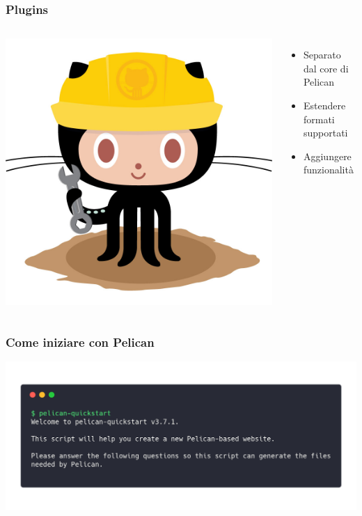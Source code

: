 \begin{frame}
	\frametitle{Plugins}
	\begin{columns}
		\begin{center}
			\includegraphics[scale=0.15]{img/octocats/constructocat2.jpg}
		\end{center}
		\begin{itemize}
			\item Separato dal core di Pelican
			\item Estendere formati supportati
			\item Aggiungere funzionalità
		\end{itemize}
	\end{columns}
\end{frame}

\begin{frame}
	\frametitle{Come iniziare con Pelican}
	\begin{center}
		\includegraphics[scale=0.2]{img/quickstart.png}
	\end{center}
\end{frame}


